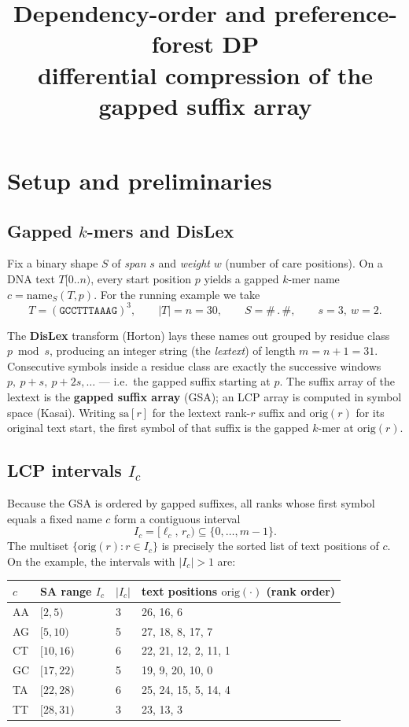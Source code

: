 \documentclass[11pt,a4paper]{article}
\title{Dependency-order and preference-forest DP\\
differential compression of the gapped suffix array}
\author{}
\date{}
\begin{document}
\maketitle

\section{Setup and preliminaries}

\subsection{Gapped \(k\)-mers and DisLex}

Fix a binary shape \(S\) of \emph{span} \(s\) and \emph{weight} \(w\)
(number of care positions). On a DNA text \(T[0..n)\), every start
position \(p\) yields a gapped \(k\)-mer name
\(c = \mathrm{name}_S(T,p)\). For the running example we take
\[
T = (\mathtt{GCCTTTAAAG})^3,\qquad
|T|=n=30,\qquad
S=\mathtt{\#\,.\,\#},\qquad
s=3,\ w=2.
\]

The \textbf{DisLex} transform (Horton) lays these names out grouped by
residue class \(p\bmod s\), producing an integer string (the
\emph{lextext}) of length \(m=n+1=31\). Consecutive symbols inside a
residue class are exactly the successive windows
\(p,\ p+s,\ p+2s,\ldots\) --- i.e.\ the gapped suffix starting at
\(p\). The suffix array of the lextext is the \textbf{gapped suffix
array} (GSA); an LCP array is computed in symbol space (Kasai). Writing
\(\mathrm{sa}[r]\) for the lextext rank-\(r\) suffix and
\(\mathrm{orig}(r)\) for its original text start, the first symbol of
that suffix is the gapped \(k\)-mer at \(\mathrm{orig}(r)\).

\subsection{LCP intervals \(I_c\)}

Because the GSA is ordered by gapped suffixes, all ranks whose first
symbol equals a fixed name \(c\) form a contiguous interval
\[
I_c = [\ell_c,\, r_c)\subseteq\{0,\ldots,m-1\}.
\]
The multiset \(\{\mathrm{orig}(r):r\in I_c\}\) is precisely the sorted
list of text positions of \(c\). On the example, the intervals with
\(|I_c|>1\) are:

\begin{center}
\begin{tabular}{@{}llll@{}}
\toprule
\(c\) & SA range \(I_c\) & \(\lvert I_c\rvert\) &
  text positions \(\mathrm{orig}(\cdot)\) (rank order) \\
\midrule
AA & \([2,5)\)   & 3 & 26, 16, 6 \\
AG & \([5,10)\)  & 5 & 27, 18, 8, 17, 7 \\
CT & \([10,16)\) & 6 & 22, 21, 12, 2, 11, 1 \\
GC & \([17,22)\) & 5 & 19, 9, 20, 10, 0 \\
TA & \([22,28)\) & 6 & 25, 24, 15, 5, 14, 4 \\
TT & \([28,31)\) & 3 & 23, 13, 3 \\
\bottomrule
\end{tabular}
\end{center}
\end{document}
